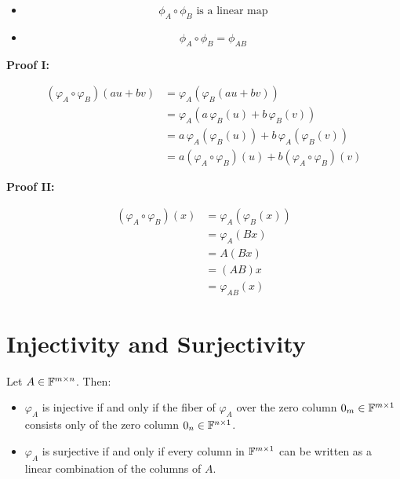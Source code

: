 \begin{itemize}

    \item
    \[
        \phi_A \circ \phi_B \text{ is a linear map}
    \]

    \item 
    \[
        \phi_A \circ \phi_B = \phi_{AB}
    \]

\end{itemize}

\textbf{Proof I:}

\begin{align*}
    (\varphi_A \circ \varphi_B)(au + bv) &= \varphi_A(\varphi_B(au + bv))\\ 
        &= \varphi_A(a\,\varphi_B(u) + b\,\varphi_B(v))\\ 
        &= a\,\varphi_A(\varphi_B(u)) + b\,\varphi_A(\varphi_B(v)) \\ 
        &= a(\varphi_A \circ \varphi_B)(u) + b(\varphi_A \circ \varphi_B)(v) 
\end{align*}

\QED 

\textbf{Proof II:}

\begin{align*}
    (\varphi_A \circ \varphi_B)(x) &= \varphi_A(\varphi_B(x)) \\
    &= \varphi_A(Bx) \\
    &= A(Bx) \\
    &= (AB)x \\
    &= \varphi_{AB}(x)
\end{align*}

\QED

\section{Injectivity and Surjectivity}

Let \( A \in \mathbb{F}^{m \times n} \). Then:

\begin{itemize}

    \item \( \varphi_A \) is injective if and only if the fiber of \( \varphi_A \) over the zero column \( 0_m \in \mathbb{F}^{m \times 1} \)
    consists only of the zero column \( 0_n \in \mathbb{F}^{n \times 1} \).

    \item  \( \varphi_A \) is surjective if and only if every column in \( \mathbb{F}^{m \times 1} \) can be written as a linear combination of the columns 
    of \( A \).

\end{itemize}

